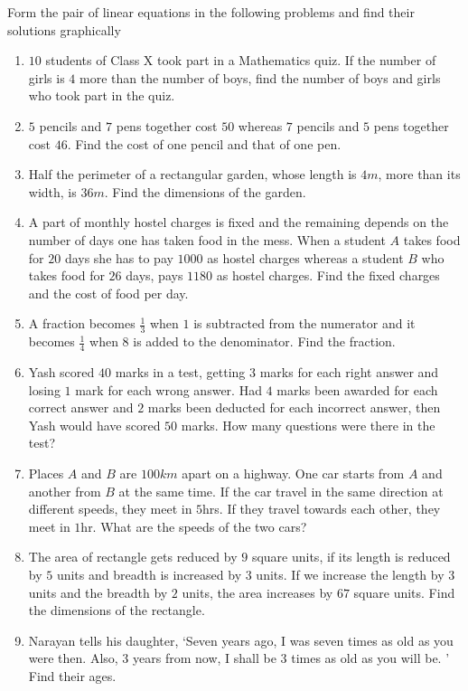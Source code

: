 Form the pair of linear equations in the following problems and find their solutions graphically
\begin{enumerate}[label=\thesubsection.\arabic*, ref=\thesubsection.\theenumi]
\item $10$ students of Class X took part in a Mathematics quiz.  If the number of girls is $4$ more than the number of boys,  find the number of boys and girls who took part in the quiz. 
\item $5$ pencils and $7$ pens together cost \rupee $50$ whereas $7$ pencils and $5$ pens together cost  \rupee $  46$.  Find the cost of one pencil and that of one pen. 
\item Half the perimeter of a rectangular garden,  whose length is $4m$,  more than its width,  is $36m$.  Find the dimensions of the garden. 
\item A part of monthly hostel charges is fixed and the remaining depends on the number of days one has taken food in the mess.  When a student $A$ takes food for $20$ days she has to pay \rupee $1000$ as hostel charges whereas a student $B$ who takes food for $26$ days,  pays \rupee $1180$ as hostel charges.  Find the fixed charges and the cost of food per day. 
\item A fraction becomes $\frac{1}{3}$ when $1$ is subtracted from the numerator and it becomes $\frac{1}{4}$ when $8$ is added to the denominator.  Find the fraction. 
\item Yash scored $40$ marks in a test,  getting $3$ marks for each right answer and losing $1$ mark for each wrong answer.  Had $4$ marks been awarded for each correct answer and $2$ marks been deducted for each incorrect answer,  then Yash would have scored $50$ marks.  How many questions were there in the test?
\item Places $A$ and $B$ are $100km$ apart on a highway.  One car starts from $A$ and another from $B$ at the same time.  If the car travel in the same direction at different speeds,  they meet in $5$hrs.  If they travel towards each other,  they meet in $1$hr.  What are the speeds of the two cars?
\item The area of rectangle gets reduced by $9$ square units,  if its length is reduced by $5$ units and breadth is increased by $3$ units.  If we increase the length by $3$ units and the breadth by $2$ units,  the area increases by $67$ square units.  Find the dimensions of the rectangle. 
\item Narayan tells his daughter,  `Seven years ago,  I was seven times as old as you were then.  Also,  $3$ years from now,  I shall be $3$ times as old as  you will be. ' Find their ages.  

\end{enumerate}
